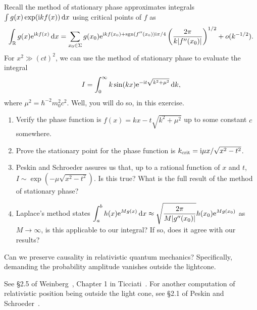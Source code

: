 \begin{exercise}
Recall the method of stationary phase approximates integrals
$\int g(x)\exp(\mathrm{i} kf(x))\,\mathrm{d} x$ using critical points of $f$ as
\begin{equation}
\int_{\mathbb{R}}g(x)\mathrm{e}^{\mathrm{i} kf(x)}\,\mathrm{d} x
= \sum_{x_{0}\in\Sigma}g(x_{0})\mathrm{e}^{\mathrm{i} k f(x_{0}) + \operatorname{sgn}(f''(x_{0}))\mathrm{i}\pi/4}\left(
\frac{2\pi}{k|f''(x_{0})|}
\right)^{1/2} + o(k^{-1/2}).
\end{equation}
For $x^{2}\gg (ct)^{2}$, we can use the method of stationary phase to
evaluate the integral
\begin{equation*}
I = \int^{\infty}_{0}k\sin(kx)\mathrm{e}^{-\mathrm{i} t\sqrt{k^{2} + \mu^{2}}}\,\mathrm{d} k,
\end{equation*}
where $\mu^{2} = \hbar^{-2}m_{0}^{2}c^{2}$. Well, you will do so, in
this exercise.
\begin{enumerate}
\item Verify the phase function is $f(x)=kx - t\sqrt{k^{2} + \mu^{2}}$ up to
  some constant $c$ somewhere.
\item Prove the stationary point for the phase function is $k_{\text{crit}}=\mathrm{i}\mu x/\sqrt{x^{2}-t^{2}}$.
\item Peskin and Schroeder assures us that, up to a rational function of
  $x$ and $t$, $I\sim\exp(-\mu\sqrt{x^{2}-t^{2}})$. Is this true? What
  is the full result of the method of stationary phase?
\item Laplace's method states $\displaystyle\int^{b}_{a} h(x) \mathrm{e}^{M g(x)}\,\mathrm{d} x \approx \sqrt{\frac{2\pi}{M|g''(x_{0})|}} h(x_{0}) \mathrm{e}^{M g(x_{0})}$  as  $M\to\infty$,
  is this applicable to our integral? If so, does it agree with our results?
\end{enumerate}
\end{exercise}

Can we preserve causality in relativistic quantum mechanics?
Specifically, demanding the probability amplitude vanishes outside the
lightcone. 



See \S2.5 of Weinberg~\cite{Weinberg:1995mt},
Chapter 1 in Ticciati~\cite{Ticciati:1999qp}. For another computation of
relativistic position being outside the light cone, see \S2.1 of
Peskin and Schroeder~\cite{Peskin:1995ev}.

